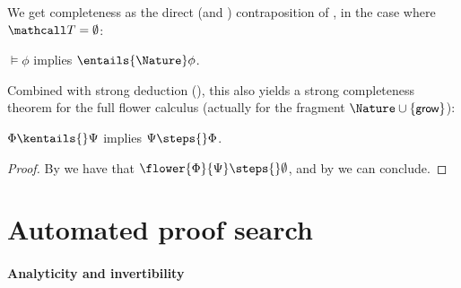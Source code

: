 We get completeness as the direct (and ) contraposition of
, in the case where $\tT = \emptyset$:

\begin{theorem}[Completeness]
  $\vDash \phi$ implies $\entails{\Nature} \phi$.
\end{theorem}

Combined with strong deduction (), this also
yields a strong completeness theorem for the full flower calculus (actually for
the fragment $\Nature \cup \{\rsf{grow}\}$):

\begin{theorem}
  $\Phi \kentails{}\Psi$ implies $\Psi \steps{} \Phi$.
\end{theorem}
\begin{proof}
  By  we have that $\flower{\Phi}{\Psi} \steps{}
  \emptyset$, and by  we can conclude.
\end{proof}

\section{Automated proof search}

\paragraph{Analyticity and invertibility}

